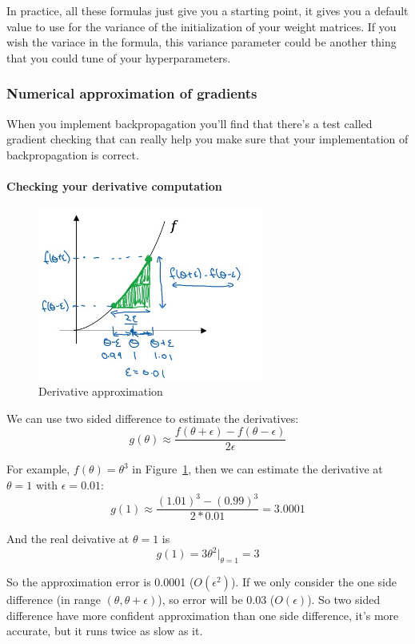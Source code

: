 \documentclass[UTF8]{article}
\begin{document}
In practice, all these formulas just give you a starting point, it gives you a default value to use
for the variance of the initialization of your weight matrices. If you wish the variace in the
formula, this variance parameter could be another thing that you could tune of your hyperparameters.

\subsubsection{Numerical approximation of gradients}
When you implement backpropagation you'll find that there's a test called gradient checking that
can really help you make sure that your implementation of backpropagation is correct.

\paragraph{Checking your derivative computation}

\begin{figure}[htb]
    \centering
    \includegraphics[width=20em]{figures/checking-derivatives}
    \caption{Derivative approximation}
    \label{fig:checking-derivatives}
\end{figure}

We can use two sided difference to estimate the derivatives:
$$ g(\theta) \approx \frac{f(\theta + \epsilon) - f(\theta - \epsilon)}{2 \epsilon} $$

For example, $f(\theta) = \theta^3$ in Figure~\ref{fig:checking-derivatives}, then we can estimate
the derivative at $\theta = 1$ with $\epsilon = 0.01$:
$$ g(1) \approx \frac{(1.01)^3 - (0.99)^3}{2 * 0.01} = 3.0001 $$

And the real deivative at $\theta = 1$ is
$$ g(1) = 3 \theta^2|_{\theta=1} = 3 $$

So the approximation error is 0.0001 ($O(\epsilon^2)$). If we only consider the one side difference
(in range $(\theta, \theta+\epsilon)$), so error will be 0.03 ($O(\epsilon)$). So two sided
difference have more confident approximation than one side difference, it's more accurate, but it
runs twice as slow as it.
\end{document}
